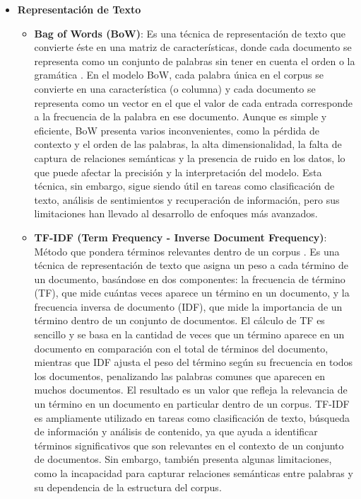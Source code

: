\begin{itemize}
        \item \textbf{Representación de Texto}
        \begin{itemize}
            \item \textbf{Bag of Words (BoW)}: Es una técnica de representación de texto que convierte éste en una matriz de características, donde cada documento se representa como un conjunto de palabras sin tener en cuenta el orden o la gramática \cite{bow}. 
            En el modelo BoW, cada palabra única en el corpus se convierte en una característica (o columna) y cada documento se representa como un vector en el que el valor de cada entrada corresponde a la frecuencia de la palabra en ese documento. 
            Aunque es simple y eficiente, BoW presenta varios inconvenientes, como la pérdida de contexto y el orden de las palabras, la alta dimensionalidad, la falta de captura de relaciones semánticas y la presencia de ruido en los datos, lo que puede afectar la precisión y la interpretación del modelo. 
            Esta técnica, sin embargo, sigue siendo útil en tareas como clasificación de texto, análisis de sentimientos y recuperación de información, pero sus limitaciones han llevado al desarrollo de enfoques más avanzados.
            
            \item \textbf{TF-IDF (Term Frequency - Inverse Document Frequency)}: Método que pondera términos relevantes dentro de un corpus \cite{tfidf}. 
            Es una técnica de representación de texto que asigna un peso a cada término de un documento, basándose en dos componentes: la frecuencia de término (TF), que mide cuántas veces aparece un término en un documento, y la frecuencia inversa de documento (IDF), que mide la importancia de un término dentro de un conjunto de documentos. 
            El cálculo de TF es sencillo y se basa en la cantidad de veces que un término aparece en un documento en comparación con el total de términos del documento, mientras que IDF ajusta el peso del término según su frecuencia en todos los documentos, penalizando las palabras comunes que aparecen en muchos documentos. 
            El resultado es un valor que refleja la relevancia de un término en un documento en particular dentro de un corpus. 
            TF-IDF es ampliamente utilizado en tareas como clasificación de texto, búsqueda de información y análisis de contenido, ya que ayuda a identificar términos significativos que son relevantes en el contexto de un conjunto de documentos. 
            Sin embargo, también presenta algunas limitaciones, como la incapacidad para capturar relaciones semánticas entre palabras y su dependencia de la estructura del corpus.
            

\end{itemize}
\end{itemize}
